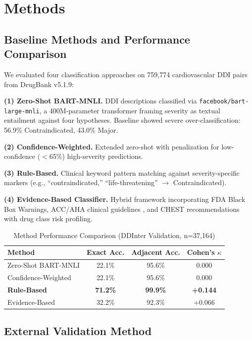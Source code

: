 \documentclass[11pt,a4paper]{article}
\begin{document}
\section*{Methods}

\subsection*{Baseline Methods and Performance Comparison}

We evaluated four classification approaches on 759,774 cardiovascular DDI pairs from DrugBank v5.1.9:

\textbf{(1) Zero-Shot BART-MNLI.} DDI descriptions classified via \texttt{facebook/bart-large-mnli}, a 400M-parameter transformer framing severity as textual entailment against four hypotheses. Baseline showed severe over-classification: 56.9\% Contraindicated, 43.0\% Major.

\textbf{(2) Confidence-Weighted.} Extended zero-shot with penalization for low-confidence ($<$65\%) high-severity predictions.

\textbf{(3) Rule-Based.} Clinical keyword pattern matching against severity-specific markers (e.g., ``contraindicated,'' ``life-threatening'' $\rightarrow$ Contraindicated).

\textbf{(4) Evidence-Based Classifier.} Hybrid framework incorporating FDA Black Box Warnings, ACC/AHA clinical guidelines \cite{joglar2023,january2019}, and CHEST recommendations with drug class risk profiling.

\begin{table}[h]
\centering
\small
\caption{Method Performance Comparison (DDInter Validation, n=37,164)}
\label{tab:methods}
\begin{tabular}{@{}lccc@{}}
\toprule
\textbf{Method} & \textbf{Exact Acc.} & \textbf{Adjacent Acc.} & \textbf{Cohen's $\kappa$} \\
\midrule
Zero-Shot BART-MNLI & 22.1\% & 95.6\% & 0.000 \\
Confidence-Weighted & 22.1\% & 95.6\% & 0.000 \\
\textbf{Rule-Based} & \textbf{71.2\%} & \textbf{99.9\%} & \textbf{+0.144} \\
Evidence-Based & 32.2\% & 92.3\% & +0.066 \\
\bottomrule
\end{tabular}
\end{table}

\subsection*{External Validation Method}
\end{document}

